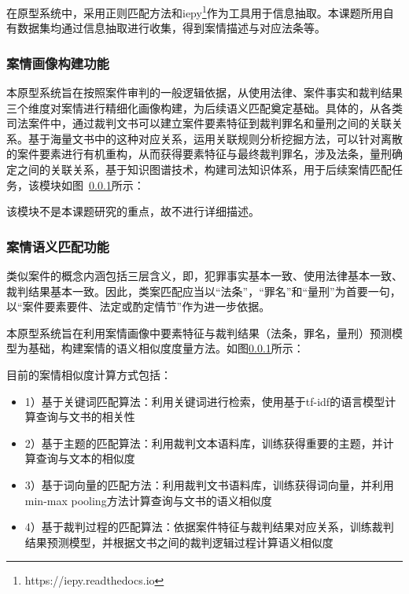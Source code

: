 在原型系统中，采用正则匹配方法和iepy\footnote{https://iepy.readthedocs.io}作为工具用于信息抽取。本课题所用自有数据集均通过信息抽取进行收集，得到案情描述与对应法条等。

\subsubsection{案情画像构建功能}
本原型系统旨在按照案件审判的一般逻辑依据，从使用法律、案件事实和裁判结果三个维度对案情进行精细化画像构建，为后续语义匹配奠定基础。具体的，从各类司法案件中，通过裁判文书可以建立案件要素特征到裁判罪名和量刑之间的关联关系。基于海量文书中的这种对应关系，运用关联规则分析挖掘方法，可以针对离散的案件要素进行有机重构，从而获得要素特征与最终裁判罪名，涉及法条，量刑确定之间的关联关系，基于知识图谱技术，构建司法知识体系，用于后续案情匹配任务，该模块如图~\ref{}所示：


该模块不是本课题研究的重点，故不进行详细描述。

\subsubsection{案情语义匹配功能}
\label{sec:sys_content}
类似案件的概念内涵包括三层含义，即，犯罪事实基本一致、使用法律基本一致、裁判结果基本一致。因此，类案匹配应当以“法条”，“罪名”和“量刑”为首要一句，以“案件要素要件、法定或酌定情节”作为进一步依据。

本原型系统旨在利用案情画像中要素特征与裁判结果（法条，罪名，量刑）预测模型为基础，构建案情的语义相似度度量方法。如图\ref{}所示：


目前的案情相似度计算方式包括：
\begin{itemize}
    \item 1）基于关键词匹配算法：利用关键词进行检索，使用基于tf-idf的语言模型计算查询与文书的相关性
    \item 2）基于主题的匹配算法：利用裁判文本语料库，训练获得重要的主题，并计算查询与文本的相似度
    \item 3）基于词向量的匹配方法：利用裁判文书语料库，训练获得词向量，并利用min-max pooling方法计算查询与文书的语义相似度
    \item 4）基于裁判过程的匹配算法：依据案件特征与裁判结果对应关系，训练裁判结果预测模型，并根据文书之间的裁判逻辑过程计算语义相似度
\end{itemize}

